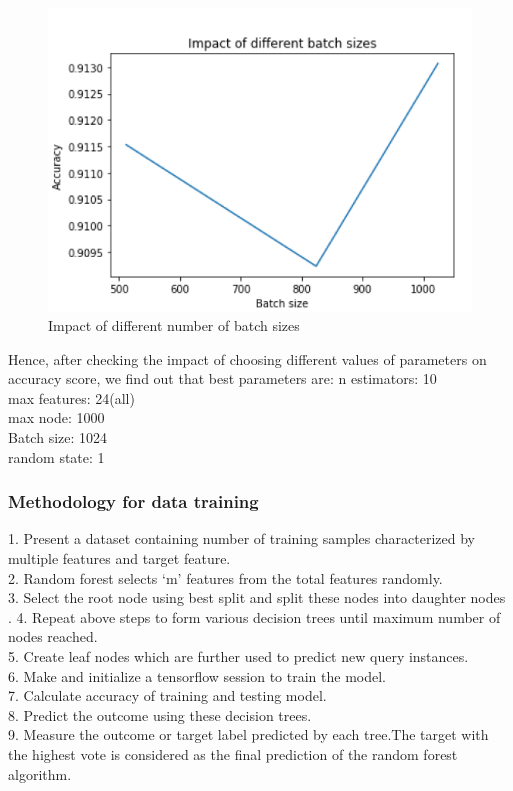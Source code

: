 \begin{figure}[h]
  		\centering
    		\includegraphics[scale=0.7]{./Figures/rfbs}
\caption{Impact of different number of batch sizes}
\label{fig:6}
 		\end{figure}

Hence, after checking the impact of choosing different values of parameters on accuracy score, we find out that best parameters are:
n estimators: 10\\
max features: 24(all)\\
max node: 1000\\
Batch size: 1024\\
random state: 1\\

\subsubsection{Methodology for data training}
1. Present a dataset containing number of training samples characterized by multiple features and target feature.\\
2. Random forest selects ‘m’ features from the total features randomly.\\
3. Select the root node using best split and split these nodes into daughter nodes\\. 
4. Repeat above steps to form various decision trees until maximum number of nodes reached.\\
5. Create leaf nodes which are further used to predict new query instances. \\
6. Make and initialize a tensorflow session to train the model. \\
7. Calculate accuracy of training and testing model. \\
8. Predict the outcome using these decision trees.\\
9. Measure the outcome or target label predicted by each tree.The target with the highest vote is considered as the final prediction of the random forest algorithm. 


